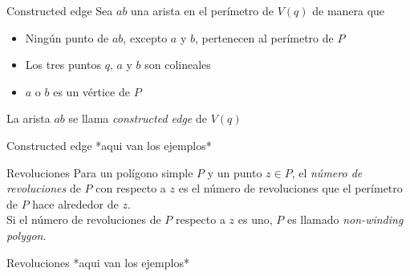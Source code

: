 \documentclass[aspectratio=169,xcolor=dvipsnames, t]{beamer}
\begin{document}
\begin{frame}{Constructed edge}
    Sea $ab$ una arista en el perímetro de $V(q)$ de manera que
	\begin{itemize}
		\item Ningún punto de $ab$, excepto $a$ y $b$, pertenecen al perímetro de $P$
		\item Los tres puntos $q$, $a$ y $b$ son colineales
		\item $a$ o $b$ es un vértice de $P$\\
	\end{itemize}
     \vspace{0.5cm}
    \begin{center}
        La arista $ab$ se llama \textit{constructed edge} de $V(q)$
    \end{center}
\end{frame}


\begin{frame}{Constructed edge}
    *aqui van los ejemplos*
\end{frame}



\begin{frame}{Revoluciones}
    Para un polígono simple $P$ y un punto $z \in P$, el \textit{número de revoluciones} de $P$ con respecto a $z$ es el número de revoluciones que el perímetro de $P$ hace alrededor de $z$.\\
    \vspace{0.5cm}
    Si el número de revoluciones de $P$ respecto a $z$ es uno, $P$ es llamado \textit{non-winding polygon}.
\end{frame}


\begin{frame}{Revoluciones}
    *aqui van los ejemplos*
\end{frame}

\end{document}
